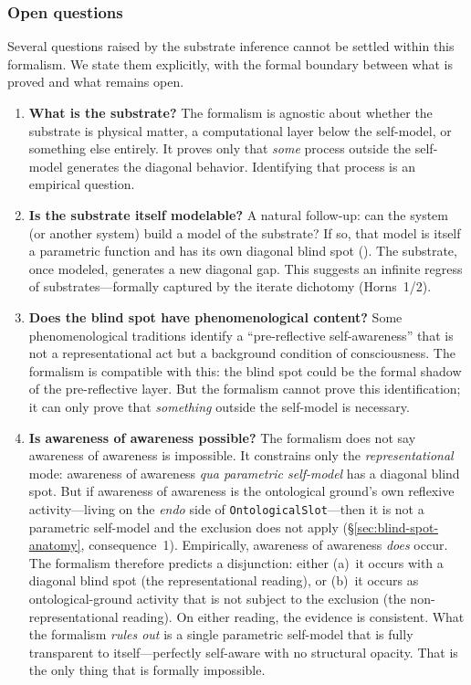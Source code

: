 \documentclass[11pt]{article}
\begin{document}
\subsubsection{Open questions}
\label{sec:open-questions-blind-spot}

Several questions raised by the substrate inference cannot be settled
within this formalism.  We state them explicitly, with the formal
boundary between what is proved and what remains open.

\begin{enumerate}[label=(\roman*),itemsep=0.3ex]
\item \textbf{What is the substrate?}  The formalism is agnostic
  about whether the substrate is physical matter, a computational
  layer below the self-model, or something else entirely.  It proves
  only that \emph{some} process outside the self-model generates the
  diagonal behavior.  Identifying that process is an empirical
  question.
\item \textbf{Is the substrate itself modelable?}  A natural follow-up:
  can the system (or another system) build a model of the substrate?
  If so, that model is itself a parametric function and
  has its own diagonal blind spot
  ().  The substrate, once
  modeled, generates a new diagonal gap.  This suggests an infinite
  regress of substrates---formally captured by the iterate
  dichotomy (Horns~1/2).
\item \textbf{Does the blind spot have phenomenological content?}
  Some phenomenological traditions identify a ``pre-reflective
  self-awareness'' that is not a representational act but a
  background condition of consciousness.  The formalism is
  compatible with this: the blind spot could be the formal shadow
  of the pre-reflective layer.  But the formalism cannot prove this
  identification; it can only prove that \emph{something} outside
  the self-model is necessary.
\item \textbf{Is awareness of awareness possible?}  The formalism
  does not say awareness of awareness is impossible.  It constrains
  only the \emph{representational} mode: awareness of awareness
  \emph{qua parametric self-model} has a diagonal blind spot.  But
  if awareness of awareness is the ontological ground's own
  reflexive activity---living on the \emph{endo} side of
  \texttt{OntologicalSlot}---then it is not a parametric self-model
  and the exclusion does not apply (\S\ref{sec:blind-spot-anatomy},
  consequence~1).  Empirically, awareness of awareness \emph{does}
  occur.  The formalism therefore predicts a disjunction: either
  (a)~it occurs with a diagonal blind spot (the representational
  reading), or (b)~it occurs as ontological-ground activity that
  is not subject to the exclusion (the non-representational reading).
  On either reading, the evidence is consistent.  What the formalism
  \emph{rules out} is a single parametric self-model that is fully
  transparent to itself---perfectly self-aware with no structural
  opacity.  That is the only thing that is formally impossible.
\end{enumerate}
\end{document}
